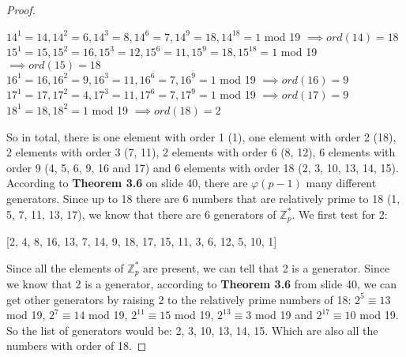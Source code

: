 \documentclass{article}
\begin{document}
\begin{proof}
\begin{center}
$14^1 = 14, 14^2 = 6, 14^3 = 8, 14^6 = 7, 14^9 = 18, 14^{18} = 1$ mod 19 $\implies ord(14) = 18$\\
$15^1 = 15, 15^2 = 16, 15^3 = 12, 15^6 = 11, 15^9 = 18, 15^{18} = 1$ mod 19 $\implies ord(15) = 18$\\
$16^1 = 16, 16^2 = 9, 16^3 = 11, 16^6 = 7, 16^9 = 1$ mod 19 $\implies ord(16) = 9$\\
$17^1 = 17, 17^2 = 4, 17^3 = 11, 17^6 = 7, 17^9 = 1$ mod 19 $\implies ord(17) = 9$\\
$18^1 = 18, 18^2 = 1$ mod 19 $\implies ord(18) = 2$\\
\end{center}
So in total, there is one element with order 1 (1), one element with order 2 (18), 2 elements with order 3 (7, 11), 2 elements with order 6 (8, 12), 6 elements with order 9 (4, 5, 6, 9, 16 and 17) and 6 elements with order 18 (2, 3, 10, 13, 14, 15).
According to \textbf{Theorem 3.6} on slide 40, there are $\varphi(p - 1)$ many different generators. Since up to 18 there are 6 numbers that are relatively prime to 18 (1, 5, 7, 11, 13, 17), we know that there are 6 generators of $\mathbb{Z}^{*}_{p}$. We first test for 2:
\begin{center}
[2, 4, 8, 16, 13, 7, 14, 9, 18, 17, 15, 11, 3, 6, 12, 5, 10, 1]
\end{center}
 Since all the elements of $\mathbb{Z}^{*}_{p}$ are present, we can tell that 2 is a generator. Since we know that 2 is a generator, according to \textbf{Theorem 3.6} from slide 40, we can get other generators by raising 2 to the relatively prime numbers of 18:  $2^{5} \equiv 13$ mod 19, $2^{7} \equiv 14$ mod 19, $2^{11} \equiv 15$ mod 19, $2^{13} \equiv 3$ mod 19 and $2^{17} \equiv 10$ mod 19. So the list of generators would be: 2, 3, 10, 13, 14, 15. Which are also all the numbers with order of 18.
\end{proof}
\end{document}
